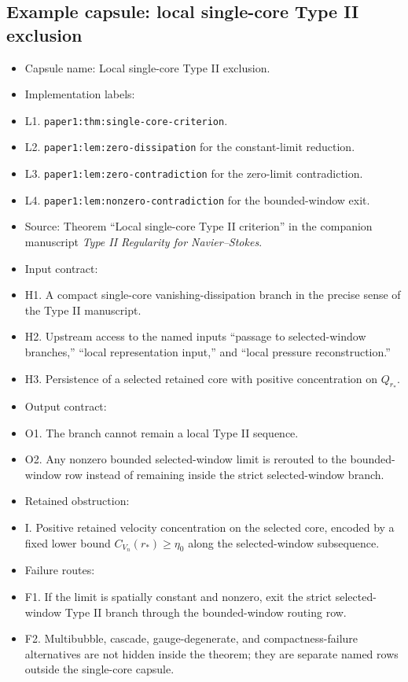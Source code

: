 \documentclass[11pt]{article}
\theoremstyle{plain}
\theoremstyle{definition}
\theoremstyle{remark}
\begin{document}
\subsection{Example capsule: local single-core Type II exclusion}
\begin{itemize}
  \item Capsule name: Local single-core Type II exclusion.
  \item Implementation labels:
  \item L1. \texttt{paper1:thm:single-core-criterion}.
  \item L2. \texttt{paper1:lem:zero-dissipation} for the constant-limit reduction.
  \item L3. \texttt{paper1:lem:zero-contradiction} for the zero-limit contradiction.
  \item L4. \texttt{paper1:lem:nonzero-contradiction} for the bounded-window exit.
  \item Source: Theorem ``Local single-core Type II criterion'' in the companion manuscript \emph{Type II Regularity for Navier--Stokes}.
  \item Input contract:
  \item H1. A compact single-core vanishing-dissipation branch in the precise sense of the Type II manuscript.
  \item H2. Upstream access to the named inputs ``passage to selected-window branches,'' ``local representation input,'' and ``local pressure reconstruction.''
  \item H3. Persistence of a selected retained core with positive concentration on $Q_{r_*}$.
  \item Output contract:
  \item O1. The branch cannot remain a local Type II sequence.
  \item O2. Any nonzero bounded selected-window limit is rerouted to the bounded-window row instead of remaining inside the strict selected-window branch.
  \item Retained obstruction:
  \item I. Positive retained velocity concentration on the selected core, encoded by a fixed lower bound $C_{V_n}(r_*)\ge \eta_0$ along the selected-window subsequence.
  \item Failure routes:
  \item F1. If the limit is spatially constant and nonzero, exit the strict selected-window Type II branch through the bounded-window routing row.
  \item F2. Multibubble, cascade, gauge-degenerate, and compactness-failure alternatives are not hidden inside the theorem; they are separate named rows outside the single-core capsule.

\end{itemize}
\end{document}
